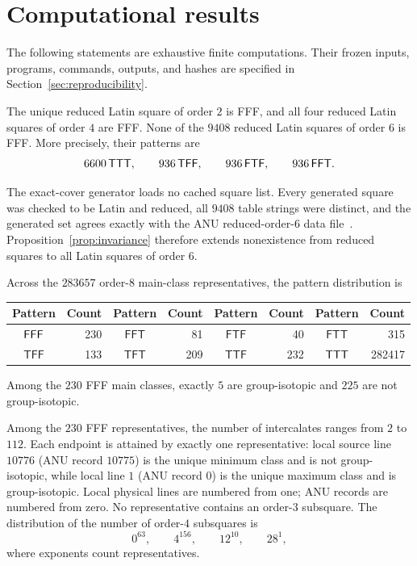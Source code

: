 \section{Computational results}

The following statements are exhaustive finite computations.  Their frozen
inputs, programs, commands, outputs, and hashes are specified in
Section~\ref{sec:reproducibility}.

\begin{computationaltheorem}\label{cthm:small-orders}
The unique reduced Latin square of order $2$ is FFF, and all four reduced
Latin squares of order $4$ are FFF.  None of the $9408$ reduced Latin squares
of order $6$ is FFF.  More precisely, their patterns are
\[
 6600\,\mathsf{TTT},\qquad 936\,\mathsf{TFF},\qquad
 936\,\mathsf{FTF},\qquad 936\,\mathsf{FFT}.
\]
\end{computationaltheorem}

The exact-cover generator loads no cached square list.  Every generated square
was checked to be Latin and reduced, all $9408$ table strings were distinct,
and the generated set agrees exactly with the ANU reduced-order-$6$ data
file~\cite{McKayLatinData}.  Proposition~\ref{prop:invariance} therefore
extends nonexistence from reduced squares to all Latin squares of order $6$.

\begin{computationaltheorem}\label{cthm:order8}
Across the $283657$ order-$8$ main-class representatives, the pattern
distribution is
\begin{center}
\begin{tabular}{cr@{\qquad}cr@{\qquad}cr@{\qquad}cr}
\toprule
Pattern & Count & Pattern & Count & Pattern & Count & Pattern & Count\\
\midrule
$\mathsf{FFF}$ & 230 & $\mathsf{FFT}$ & 81 & $\mathsf{FTF}$ & 40 &
$\mathsf{FTT}$ & 315\\
$\mathsf{TFF}$ & 133 & $\mathsf{TFT}$ & 209 & $\mathsf{TTF}$ & 232 &
$\mathsf{TTT}$ & 282417\\
\bottomrule
\end{tabular}
\end{center}
Among the $230$ FFF main classes, exactly $5$ are group-isotopic and $225$
are not group-isotopic.
\end{computationaltheorem}

\begin{computationaltheorem}
Among the $230$ FFF representatives, the number of intercalates ranges from
$2$ to $112$.  Each endpoint is attained by exactly one representative: local
source line $10776$ (ANU record $10775$) is the unique minimum class and is not
group-isotopic, while local line $1$ (ANU record $0$) is the unique maximum
class and is group-isotopic.  Local physical lines are numbered from one;
ANU records are numbered from zero.  No representative
contains an order-$3$ subsquare.  The distribution of the number of order-$4$
subsquares is
\[
  0^{63},\qquad 4^{156},\qquad 12^{10},\qquad 28^1,
\]
where exponents count representatives.
\end{computationaltheorem}

